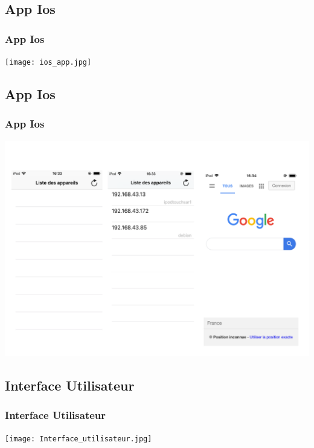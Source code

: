 \documentclass{beamer}
\begin{document}
	
	\begin{frame}
	\section{App Ios}
		\begin{center}
		\frametitle{App Ios}
        \texttt{[image: ios\_app.jpg]}
		\end{center}
	\end{frame}
	
	\begin{frame}
	\section{App Ios}
		\begin{center}
		\frametitle{App Ios}
        \includegraphics[scale=0.37]{ipod.png}
		\end{center}
	\end{frame}
	
		\begin{frame}
	\section{Interface Utilisateur}
		\begin{center}
		\frametitle{Interface Utilisateur}
        \texttt{[image: Interface\_utilisateur.jpg]}
		\end{center}
	\end{frame}
	
\end{document}
